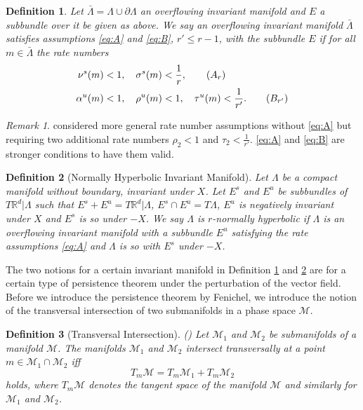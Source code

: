 \documentclass[a4paper,11pt]{article}
\newtheorem{definition}{Definition}[section]
\theoremstyle{remark}
\newtheorem{remark}{Remark}[section]
\begin{document}
\begin{definition} \label{def:over}
Let $\bar{\Lambda}=\Lambda \cup \partial\Lambda$  an overflowing invariant manifold and $E$ a subbundle over it be given as above. We say an overflowing invariant manifold $\bar{\Lambda}$ satisfies assumptions \eqref{eq:A} and \eqref{eq:B}, $r'\le r-1$, with the subbundle $E$ if for all $m\in \bar{\Lambda}$ the rate numbers
\begin{align}
\nu^s(m)&<1, \quad \sigma^s(m)<\frac{1}{r}, \label{eq:A}\tag{$A_r$}   \\
\alpha^u(m)&<1, \quad \rho^u(m)<1, \quad \tau^u(m)<\frac{1}{r'}. \label{eq:B}\tag{$B_{r'}$}  
\end{align}
\end{definition}
\begin{remark}
 \cite{fenichel_asymptotic_1977} considered more general rate number assumptions without \eqref{eq:A} but requiring two additional rate numbers $\rho_2<1$ and $\tau_2<\frac{1}{r'}$. \eqref{eq:A} and \eqref{eq:B} are stronger conditions to have them valid. %
\end{remark}
\begin{definition}[Normally Hyperbolic Invariant Manifold] \label{def:nhim}
 Let $\Lambda$ be a compact manifold without boundary, invariant under $X$. Let $E^s$ and $E^u$ be subbundles of $T \mathbb{R}^d|\Lambda$ such that $E^s + E^u = T \mathbb{R}^d|\Lambda$, $E^s\cap E^u=T\Lambda$, $E^u$ is negatively invariant under $X$ and $E^s$ is so under $-X$. We say $\Lambda$ is $r$-normally hyperbolic if $\Lambda$ is an overflowing invariant manifold with a subbundle $E^u$ satisfying the rate assumptions \eqref{eq:A} and $\Lambda$ is so with $E^s$ under $-X$. 
\end{definition}
The two notions for a certain invariant manifold in Definition \ref{def:over} and \ref{def:nhim} are for a certain type of persistence theorem under the perturbation of the vector field. Before we introduce the persistence theorem by Fenichel, we introduce the notion of the transversal intersection of two submanifolds in a phase space $\mathcal{M}$.
\begin{definition}[Transversal Intersection]  (\cite[Definition 3.1]{Sz1991})
 Let ${\mathcal{M}}_1$ and ${\mathcal{M}}_2$ be submanifolds of a manifold ${\mathcal{M}}$. The manifolds ${\mathcal{M}}_1$ and ${\mathcal{M}}_2$ intersect transversally at a point $m\in{\mathcal{M}}_1\cap {\mathcal{M}}_2$ iff 
 $$T_m{\mathcal{M}} =  T_m{\mathcal{M}}_1+T_m{\mathcal{M}}_2$$
 holds, where $T_m\mathcal{M}$ denotes the tangent space of the manifold $\mathcal{M}$ and similarly for $\mathcal{M}_1$ and $\mathcal{M}_2$.
\end{definition}
\end{document}
